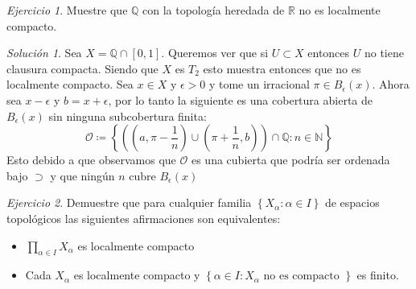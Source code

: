 \documentclass[notitlepage]{report}
\theoremstyle{definition}
\theoremstyle{remark}
\newtheorem{exc}{Ejercicio}
\newtheorem*{sol}{Solución}
\newcommand{\set}[1]{\left\lbrace #1 \right\rbrace}
\newcommand{\RR}{\mathbb{R}}
\newcommand{\QQ}{\mathbb{Q}}
\newcommand{\NN}{\mathbb{N}}
\begin{document}
\begin{exc}
	Muestre que $ \QQ $ con la topología heredada de $ \RR  $ no es localmente compacto.
\end{exc}
\begin{sol}
	Sea $ X = \QQ \cap [0,1] $. Queremos ver que si $ U \subset X $ entonces $ U  $ no tiene clausura compacta. Siendo que $ X $ es $ T_2 $ esto muestra entonces que no es localmente compacto. Sea $ x \in X $ y $ \epsilon > 0 $ y tome un irracional $ \pi \in B_\epsilon(x) $. Ahora sea $  x - \epsilon $ y $ b = x + \epsilon $, por lo tanto la siguiente es una cobertura abierta de $ B_\epsilon(x) $ sin ninguna subcobertura finita:
	\[ \mathcal{O} \coloneqq \set{((a,\pi-\frac{1}{n}) \cup (\pi + \dfrac{1}{n},b)) \cap \QQ : n \in \NN} \]
	Esto debido a que observamos que $ \mathcal{O} $ es una cubierta que podría ser ordenada bajo $ \supset $ y que ningún $ n  $ cubre $ B_\epsilon(x) $
\end{sol}
\begin{exc}
	Demuestre que para cualquier familia $ \set{X_\alpha : \alpha \in I} $ de espacios topológicos las siguientes afirmaciones son equivalentes:
	\begin{itemize}
		\item $ \prod_{\alpha \in I}^{} X_\alpha $ es localmente compacto
		\item Cada $ X_\alpha $ es localmente compacto y $ \set{\alpha \in I: X_\alpha \textrm{ no es compacto }} $ es finito.
	\end{itemize}
\end{exc}
\end{document}
